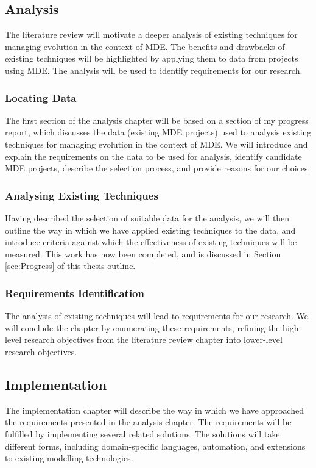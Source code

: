 \subsection{Analysis}
The literature review will motivate a deeper analysis of existing techniques for managing evolution in the context of MDE. The benefits and drawbacks of existing techniques will be highlighted by applying them to data from projects using MDE. The analysis will be used to identify requirements for our research.

\subsubsection{Locating Data}
The first section of the analysis chapter will be based on a section of my progress report, which discusses the data (existing MDE projects) used to analysis existing techniques for managing evolution in the context of MDE. We will introduce and explain the requirements on the data to be used for analysis, identify candidate MDE projects, describe the selection process, and provide reasons for our choices.

\subsubsection{Analysing Existing Techniques}
Having described the selection of suitable data for the analysis, we will then outline the way in which we have applied existing techniques to the data, and introduce criteria against which the effectiveness of existing techniques will be measured. This work has now been completed, and is discussed in Section \ref{sec:Progress} of this thesis outline.

\subsubsection{Requirements Identification}
The analysis of existing techniques will lead to requirements for our research. We will conclude the chapter by enumerating these requirements, refining the high-level research objectives from the literature review chapter into lower-level research objectives.


\subsection{Implementation}
The implementation chapter will describe the way in which we have approached the requirements presented in the analysis chapter. The requirements will be fulfilled by implementing several related solutions. The solutions will take different forms, including domain-specific languages, automation, and extensions to existing modelling technologies.

